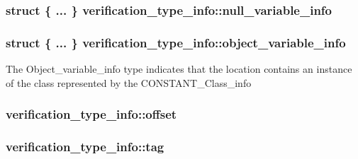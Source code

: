 \subsubsection[{\texorpdfstring{null\+\_\+variable\+\_\+info}{null_variable_info}}]{\setlength{\rightskip}{0pt plus 5cm}struct \{ ... \}   verification\+\_\+type\+\_\+info\+::null\+\_\+variable\+\_\+info}\hypertarget{structverification__type__info_a42ba92ebe27d42af296a395c54fa10ad}{}\label{structverification__type__info_a42ba92ebe27d42af296a395c54fa10ad}
\subsubsection[{\texorpdfstring{object\+\_\+variable\+\_\+info}{object_variable_info}}]{\setlength{\rightskip}{0pt plus 5cm}struct \{ ... \}   verification\+\_\+type\+\_\+info\+::object\+\_\+variable\+\_\+info}\hypertarget{structverification__type__info_a8cc9c3b34278efa436261995cd97a326}{}\label{structverification__type__info_a8cc9c3b34278efa436261995cd97a326}
The Object\+\_\+variable\+\_\+info type indicates that the location contains an instance of the class represented by the C\+O\+N\+S\+T\+A\+N\+T\+\_\+\+Class\+\_\+info 
\subsubsection[{\texorpdfstring{offset}{offset}}]{ verification\+\_\+type\+\_\+info\+::offset}\hypertarget{structverification__type__info_a697499159761ac261e39a9f7aabfb27d}{}\label{structverification__type__info_a697499159761ac261e39a9f7aabfb27d}
\subsubsection[{\texorpdfstring{tag}{tag}}]{ verification\+\_\+type\+\_\+info\+::tag}\hypertarget{structverification__type__info_aeb9c72b398b4d3ce0863a916f973b05c}{}\label{structverification__type__info_aeb9c72b398b4d3ce0863a916f973b05c}
